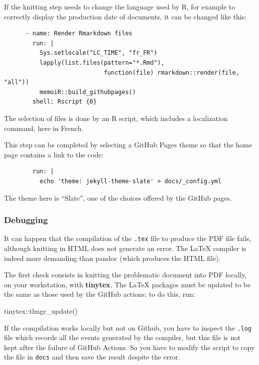 \documentclass[
  12pt,
  american,
  a4paper,
  extrafontsizes,onecolumn,openright
  ]{memoir}
\newenvironment{Shaded}{\begin{snugshade}}{\end{snugshade}}
\newcommand{\FunctionTok}[1]{\textcolor[rgb]{0.00,0.00,0.00}{#1}}
\newcommand{\NormalTok}[1]{#1}
\newcommand{\SpecialCharTok}[1]{\textcolor[rgb]{0.00,0.00,0.00}{#1}}
\begin{document}
If the knitting step needs to change the language used by R, for example to correctly display the production date of documents, it can be changed like this:

\begin{verbatim}
      - name: Render Rmarkdown files
        run: |
          Sys.setlocale("LC_TIME", "fr_FR")
          lapply(list.files(pattern="*.Rmd"), 
                            function(file) rmarkdown::render(file, "all"))
          memoiR::build_githubpages()
        shell: Rscript {0}
\end{verbatim}

The selection of files is done by an R script, which includes a localization command, here in French.

This step can be completed by selecting a GitHub Pages theme so that the home page contains a link to the code:

\begin{verbatim}
        run: |
          echo 'theme: jekyll-theme-slate' > docs/_config.yml
\end{verbatim}

The theme here is \enquote{Slate}, one of the choices offered by the GitHub pages.

\hypertarget{debugging}{%
\subsubsection{Debugging}\label{debugging}}

It can happen that the compilation of the \texttt{.tex} file to produce the PDF file fails, although knitting in HTML does not generate an error.
The LaTeX compiler is indeed more demanding than pandoc (which produces the HTML file).

The first check consists in knitting the problematic document into PDF locally, on your workstation, with \textbf{tinytex}.
The LaTeX packages must be updated to be the same as those used by the GitHub actions: to do this, run:

\scriptsize

\begin{Shaded}
\begin{Highlighting}[]
\NormalTok{tinytex}\SpecialCharTok{::}\FunctionTok{tlmgr\_update}\NormalTok{()}
\end{Highlighting}
\end{Shaded}

\normalsize

If the compilation works locally but not on Github, you have to inspect the \texttt{.log} file which records all the events generated by the compiler, but this file is not kept after the failure of GitHub Actions.
So you have to modify the script to copy the file in \texttt{docs} and then save the result despite the error.
\end{document}
